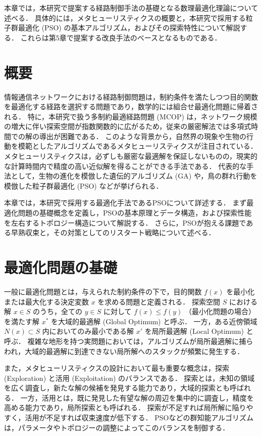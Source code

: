 
本章では，本研究で提案する経路制御手法の基礎となる数理最適化理論について述べる．
具体的には，メタヒューリスティクスの概要と，本研究で採用する粒子群最適化 (PSO) の基本アルゴリズム，およびその探索特性について解説する．
これらは第5章で提案する改良手法のベースとなるものである．

\section{概要}
情報通信ネットワークにおける経路制御問題は，制約条件を満たしつつ目的関数を最適化する経路を選択する問題であり，数学的には組合せ最適化問題に帰着される．
特に，本研究で扱う多制約最適経路問題 (MCOP) は，ネットワーク規模の増大に伴い探索空間が指数関数的に広がるため，従来の厳密解法では多項式時間での解の導出が困難である．
このような背景から，自然界の現象や生物の行動を模範としたアルゴリズムであるメタヒューリスティクスが注目されている．
メタヒューリスティクスは，必ずしも厳密な最適解を保証しないものの，現実的な計算時間内で精度の高い近似解を得ることができる手法である．
代表的な手法として，生物の進化を模倣した遺伝的アルゴリズム (GA) や，鳥の群れ行動を模倣した粒子群最適化 (PSO) などが挙げられる．

本章では，本研究で採用する最適化手法であるPSOについて詳述する．
まず最適化問題の基礎概念を定義し，PSOの基本原理とデータ構造，および探索性能を左右するトポロジー構造について解説する．
さらに，PSOが抱える課題である早熟収束と，その対策としてのリスタート戦略について述べる．

\section{最適化問題の基礎}
一般に最適化問題とは，与えられた制約条件の下で，目的関数 $f(x)$ を最小化または最大化する決定変数 $x$ を求める問題と定義される\cite{aiyoshi2002}．
探索空間 $S$ における解 $x \in S$ のうち，全ての $y \in S$ に対して $f(x) \le f(y)$ （最小化問題の場合）を満たす解 $x^*$ を大域的最適解 (Global Optimum) と呼ぶ．
一方，ある近傍領域 $N(x) \subset S$ 内においてのみ最小である解 $x'$ を局所最適解 (Local Optimum) と呼ぶ．
複雑な地形を持つ実問題においては，アルゴリズムが局所最適解に捕らわれ，大域的最適解に到達できない局所解へのスタックが頻繁に発生する．

また，メタヒューリスティクスの設計において最も重要な概念は，探索 (Exploration) と活用 (Exploitation) のバランスである\cite{iba2011}．
探索とは，未知の領域を広く調査し，新たな解の候補を発見する能力であり，大域的探索とも呼ばれる．
一方，活用とは，既に発見した有望な解の周辺を集中的に調査し，精度を高める能力であり，局所探索とも呼ばれる．
探索が不足すれば局所解に陥りやすく，活用が不足すれば収束速度が低下する．
PSOなどの群知能アルゴリズムは，パラメータやトポロジーの調整によってこのバランスを制御する．

